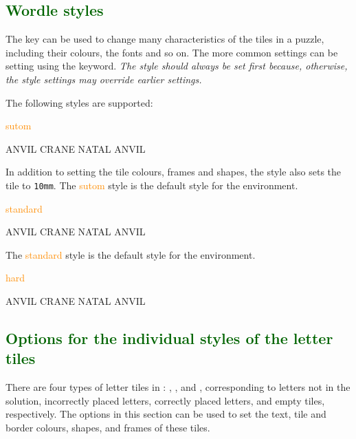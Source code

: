 \documentclass[svgnames]{report}
\newcommand\Section[1]{\subsection{\textcolor{DarkGreen}{#1}}}
\begin{document}
  \Section{Wordle styles}

  The  key can be used to change many characteristics of
  the tiles in a  puzzle, including their colours, the
  fonts and so on.  The more common settings can be setting using the
   keyword. \textit{The style should always be set first
  because, otherwise, the style settings may override earlier settings.}

  The following styles are supported:

  \textcolor{DarkOrange}{sutom}

  \begin{example}
  \begin{wordle}[style=sutom]{ANVIL}
    CRANE
    NATAL
    ANVIL
  \end{wordle}
  \end{example}

  In addition to setting the tile colours, frames and shapes, the
   style also sets the tile  to
  \texttt{10mm}.  The \textcolor{DarkOrange}{sutom} style is the default
  style for the  environment.

  \textcolor{DarkOrange}{standard}

  \begin{example}
  \begin{wordle}[style=standard]{ANVIL}
    CRANE
    NATAL
    ANVIL
  \end{wordle}
  \end{example}

  The \textcolor{DarkOrange}{standard} style is the default style for the
   environment.

  \textcolor{DarkOrange}{hard}

  \begin{example}
  \begin{wordle}[style=hard]{ANVIL}
    CRANE
    NATAL
    ANVIL
  \end{wordle}
  \end{example}

  \Section{Options for the individual styles of the letter tiles}

  There are four types of letter tiles in :
  , ,  and
  , corresponding to letters not in the solution,
  incorrectly placed letters, correctly placed letters, and empty
  tiles, respectively. The options in this section can be used to set
  the text, tile and border colours, shapes, and frames of these tiles.
\end{document}
